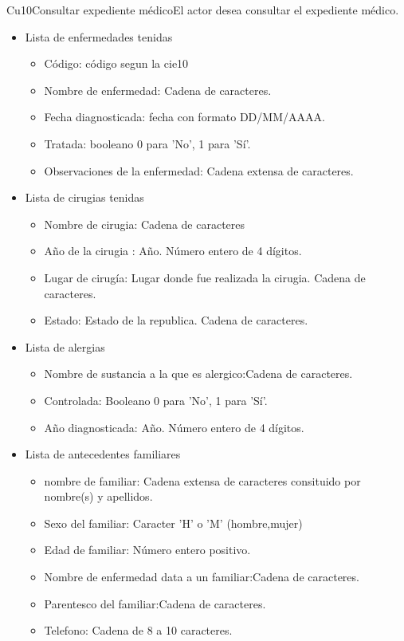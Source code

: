\begin{UseCase}{Cu10}{Consultar expediente médico}{El actor desea consultar el expediente médico.}
{\begin{itemize}
\begin{itemize}
        \end{itemize}
        
       \item Lista de enfermedades tenidas
        \begin{itemize}
            \item Código: código segun la cie10
            \item Nombre de enfermedad: Cadena de caracteres. 
            \item Fecha diagnosticada: fecha con formato  DD/MM/AAAA.
            \item Tratada:  booleano 0 para 'No', 1 para 'Sí'.
            \item Observaciones de la enfermedad: Cadena extensa de caracteres.
        \end{itemize}
        \item Lista de cirugias tenidas
        \begin{itemize}
            \item Nombre de cirugia: Cadena de caracteres
            \item Año de la cirugia : Año. Número entero de 4 dígitos.
            \item Lugar de cirugía: Lugar donde fue realizada la cirugia. Cadena de caracteres.
            \item Estado: Estado de la republica. Cadena de caracteres.
        \end{itemize}
        
        \item Lista de alergias
        \begin{itemize}
            \item Nombre de sustancia a la que es alergico:Cadena de caracteres.
            \item Controlada: Booleano 0 para 'No', 1 para 'Sí'.
            \item Año diagnosticada: Año. Número entero de 4 dígitos. 
        \end{itemize}
        
  \item Lista de antecedentes familiares
        
        \begin{itemize}
            \item nombre de familiar: Cadena extensa de caracteres consituido por nombre(s) y apellidos.
            \item Sexo del familiar: Caracter 'H' o 'M' (hombre,mujer)
            \item Edad de familiar: Número entero positivo.
            \item Nombre de enfermedad data a un familiar:Cadena de caracteres.
            \item Parentesco del familiar:Cadena de caracteres.
            \item Telefono: Cadena de 8 a 10 caracteres.


\end{itemize}
\end{itemize}}
\end{UseCase}
